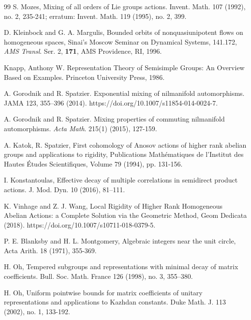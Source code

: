\documentclass[11 pt]{amsart}
\theoremstyle{definition}
\numberwithin{equation}{section}
\begin{document}
\begin{thebibliography}{99}
 S. Mozes, Mixing of all orders of Lie groups actions. Invent. Math. 107 (1992), no. 2, 235-241; erratum:
Invent. Math. 119 (1995), no. 2, 399.






 D. Kleinbock and G. A. Margulis, Bounded orbits of
nonquasiunipotent flows on homogeneous spaces, Sinai's Moscow
Seminar on Dynamical Systems, 141.172, {\em AMS Transl}. Ser.
2, {\bf 171}, AMS  Providence, RI, 1996.


 Knapp, Anthony W. Representation Theory of Semisimple Groups: An Overview Based on Examples. Princeton University Press, 1986.







 A. Gorodnik and R. Spatzier. Exponential mixing of nilmanifold automorphisms. JAMA 123, 355–396 (2014). https://doi.org/10.1007/s11854-014-0024-7.



    A. Gorodnik and R. Spatzier. Mixing properties of commuting nilmanifold automorphisms. \emph{Acta Math}.
215(1) (2015), 127-159.

A. Katok, R. Spatzier, First cohomology of Anosov actions of higher rank abelian groups and applications to rigidity, Publications Math{\'e}matiques de l'Institut des Hautes {\'E}tudes Scientifiques, Volume 79 (1994), pp. 131-156.

 I. Konstantoulas, Effective decay of multiple correlations in semidirect product actions. J. Mod. Dyn. 10
(2016), 81–111.

 K. Vinhage and Z. J. Wang, Local Rigidity of Higher Rank Homogeneous Abelian
Actions: a Complete Solution via the Geometric Method, Geom Dedicata (2018). https://doi.org/10.1007/s10711-018-0379-5.

 P. E. Blanksby and H. L. Montgomery, Algebraic integers near the unit circle, Acta Arith.
18 (1971), 355-369.


 H. Oh, Tempered subgroups and representations with minimal decay of matrix coefficients. Bull. Soc. Math.
France 126 (1998), no. 3, 355–380.



H. Oh, Uniform pointwise bounds for matrix coefficients of unitary representations and applications to
Kazhdan constants. Duke Math. J. 113 (2002), no. 1, 133-192.




\end{thebibliography}
\end{document}
